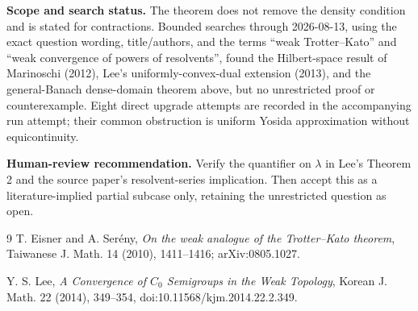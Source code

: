 \documentclass[11pt]{article}
\begin{document}
\textbf{Scope and search status.} The theorem does not remove the density
condition and is stated for contractions.  Bounded searches through
2026-08-13, using the exact question wording, title/authors, and the terms
``weak Trotter--Kato'' and ``weak convergence of powers of resolvents'', found
the Hilbert-space result of Marinoschi (2012), Lee's uniformly-convex-dual
extension (2013), and the general-Banach dense-domain theorem above, but no
unrestricted proof or counterexample.  Eight direct upgrade attempts are
recorded in the accompanying run attempt; their common obstruction is uniform
Yosida approximation without equicontinuity.

\textbf{Human-review recommendation.} Verify the quantifier on $\lambda$ in
Lee's Theorem 2 and the source paper's resolvent-series implication.  Then
accept this as a literature-implied partial subcase only, retaining the
unrestricted question as open.

\begin{thebibliography}{9}
T. Eisner and A. Ser\'eny,
\emph{On the weak analogue of the Trotter--Kato theorem},
Taiwanese J. Math. 14 (2010), 1411--1416; arXiv:0805.1027.

Y. S. Lee,
\emph{A Convergence of $C_0$ Semigroups in the Weak Topology},
Korean J. Math. 22 (2014), 349--354,
doi:10.11568/kjm.2014.22.2.349.
\end{thebibliography}
\end{document}
